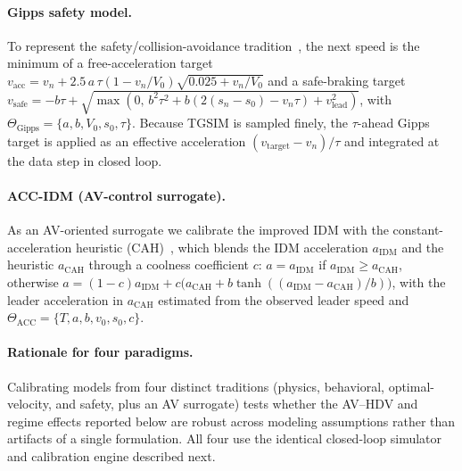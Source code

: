 \documentclass[11pt]{article}
\begin{document}
\paragraph{Gipps safety model.} To represent the safety/collision-avoidance
tradition~\cite{gipps1981}, the next speed is the minimum of a free-acceleration
target $v_{\mathrm{acc}}=v_n+2.5\,a\,\tau(1-v_n/V_0)\sqrt{0.025+v_n/V_0}$ and a
safe-braking target
$v_{\mathrm{safe}}=-b\tau+\sqrt{\max(0,\,b^2\tau^2+b(2(s_n-s_0)-v_n\tau)+v_{\mathrm{lead}}^2)}$,
with $\Theta_{\mathrm{Gipps}}=\{a,b,V_0,s_0,\tau\}$. Because TGSIM is sampled
finely, the $\tau$-ahead Gipps target is applied as an effective acceleration
$(v_{\mathrm{target}}-v_n)/\tau$ and integrated at the data step in closed loop.

\paragraph{ACC-IDM (AV-control surrogate).} As an AV-oriented surrogate we
calibrate the improved IDM with the constant-acceleration heuristic
(CAH)~\cite{kesting2010}, which blends the IDM acceleration $a_{\mathrm{IDM}}$ and
the heuristic $a_{\mathrm{CAH}}$ through a coolness coefficient $c$:
$a=a_{\mathrm{IDM}}$ if $a_{\mathrm{IDM}}\ge a_{\mathrm{CAH}}$, otherwise
$a=(1-c)a_{\mathrm{IDM}}+c\big(a_{\mathrm{CAH}}+b\tanh((a_{\mathrm{IDM}}-a_{\mathrm{CAH}})/b)\big)$,
with the leader acceleration in $a_{\mathrm{CAH}}$ estimated from the observed
leader speed and $\Theta_{\mathrm{ACC}}=\{T,a,b,v_0,s_0,c\}$.

\paragraph{Rationale for four paradigms.} Calibrating models from four distinct
traditions (physics, behavioral, optimal-velocity, and safety, plus an AV
surrogate) tests whether the AV--HDV and regime effects reported below are robust
across modeling assumptions rather than artifacts of a single formulation. All
four use the identical closed-loop simulator and calibration engine described
next.
\end{document}
